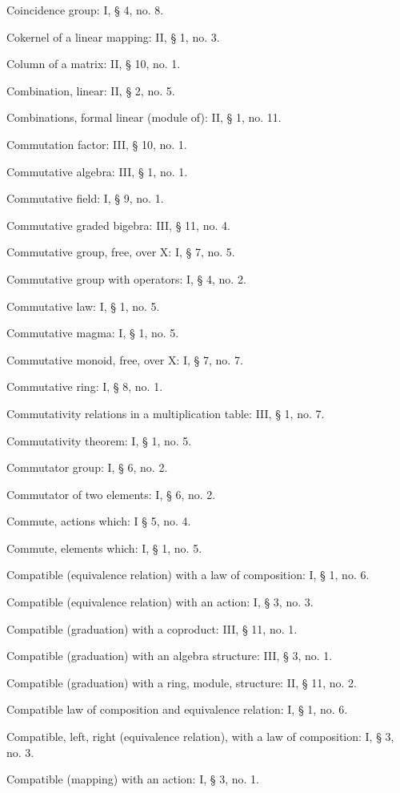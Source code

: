Coincidence group: I, § 4, no. 8.

Cokernel of a linear mapping: II, § 1, no. 3.

Column of a matrix: II, § 10, no. 1.

Combination, linear: II, § 2, no. 5.

Combinations, formal linear (module of): II, § 1, no. 11.

Commutation factor: III, § 10, no. 1.

Commutative algebra: III, § 1, no. 1.

Commutative field: I, § 9, no. 1.

Commutative graded bigebra: III, § 11, no. 4.

Commutative group, free, over X: I, § 7, no. 5.

Commutative group with operators: I, § 4, no. 2.

Commutative law: I, § 1, no. 5.

Commutative magma: I, § 1, no. 5.

Commutative monoid, free, over X: I, § 7, no. 7.

Commutative ring: I, § 8, no. 1.

Commutativity relations in a multiplication table: III, § 1, no. 7.

Commutativity theorem: I, § 1, no. 5.

Commutator group: I, § 6, no. 2.

Commutator of two elements: I, § 6, no. 2.

Commute, actions which: I § 5, no. 4.

Commute, elements which: I, § 1, no. 5.

Compatible (equivalence relation) with a law of composition: I, § 1, no. 6.

Compatible (equivalence relation) with an action: I, § 3, no. 3.

Compatible (graduation) with a coproduct: III, § 11, no. 1.

Compatible (graduation) with an algebra structure: III, § 3, no. 1.

Compatible (graduation) with a ring, module, structure: II, § 11, no. 2.

Compatible law of composition and equivalence relation: I, § 1, no. 6.

Compatible, left, right (equivalence relation), with a law of composition: I, § 3, no. 3.

Compatible (mapping) with an action: I, § 3, no. 1.

